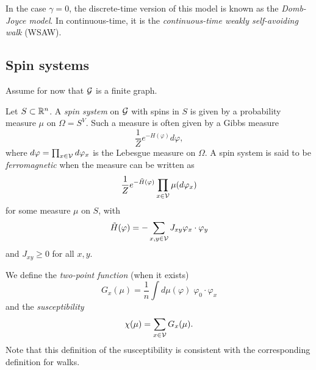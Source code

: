 In the case $\gamma = 0$, the discrete-time version of this model is known as
the \emph{Domb-Joyce model}. In continuous-time, it is the \emph{continuous-time
weakly self-avoiding walk} (WSAW).


\subsection{Spin systems}

Assume for now that $\mathcal{G}$ is a finite graph.

Let $S \subset {\mathbb R}^n$. A \emph{spin system} on $\mathcal{G}$ with spins in $S$ is given
by a probability measure $\mu$ on $\Omega = S^V$. Such a measure is often given by a
Gibbs measure
\begin{equation}
\frac{1}{Z} e^{-H(\varphi)} d\varphi,
\end{equation}
where $d\varphi = \prod_{x\in\mathcal{V}} d\varphi_x$ is the Lebesgue measure on
$\Omega$. A spin system is said to be \emph{ferromagnetic} when the measure can
be written as
\begin{equation}
\frac{1}{Z} e^{-\tilde H(\varphi)} \prod_{x\in\mathcal{V}} \mu(d\varphi_x)
\end{equation}
for some measure $\mu$ on $S$, with
\begin{equation}
\tilde H(\varphi) = -\sum_{x, y \in \mathcal{V}} J_{xy} \varphi_x \cdot \varphi_y
\end{equation}
and $J_{xy} \ge 0$ for all $x, y$.


We define the \emph{two-point function} (when it exists)
\begin{equation}
G_x(\mu) = \frac{1}{n} \int d\mu(\varphi) \; \varphi_0 \cdot \varphi_x
\end{equation}
and the \emph{susceptibility}
\begin{equation}
\chi(\mu) = \sum_{x\in\mathcal{V}} G_x(\mu).
\end{equation}
Note that this definition of the susceptibility is consistent with the corresponding
definition for walks.

